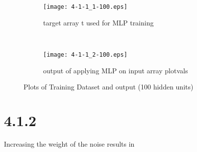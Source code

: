 \documentclass[a4paper,11pt]{article}
\theoremstyle{definition}
\theoremstyle{plain}
\theoremstyle{remark}
\begin{document}
\begin{figure}
\begin{subfigure}[b]{0.45\textwidth}
\centering
\texttt{[image: 4-1-1\_1-100.eps]}
\caption{target array t used for MLP training}
\end{subfigure}
~
\begin{subfigure}[b]{0.45\textwidth}
\centering
\texttt{[image: 4-1-1\_2-100.eps]}
\caption{output of applying MLP on input array plotvals}
\end{subfigure}

\centering
\caption{Plots of Training Dataset and output (100 hidden units)}
\label{fig:MLP-100}
\end{figure}


\section*{4.1.2}

Increasing the weight of the noise results in 
\end{document}
